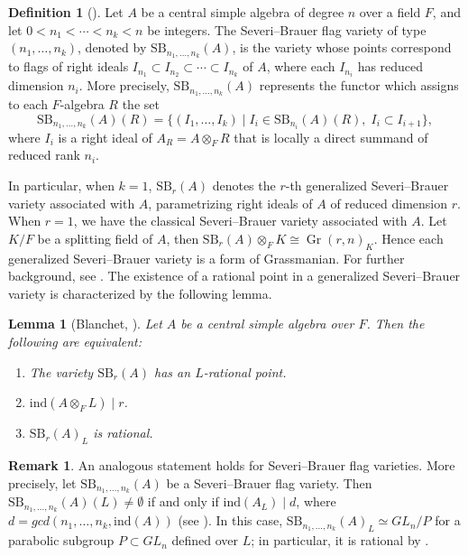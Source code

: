 \documentclass[10pt]{amsart}
\theoremstyle{plain}
\newtheorem{lemma}[thm]{Lemma}
\theoremstyle{definition}
\newtheorem{remark}[thm]{Remark}
\newtheorem{definition}[thm]{Definition}
\begin{document}
\begin{definition}[{\cite[Definition 4.1]{zerocycle}}]\label{flag}
Let \(A\) be a central simple algebra of degree \(n\) over a field \(F\), and let
\(0 < n_1 < \cdots < n_k < n\) be integers.
The Severi--Brauer flag variety of type \((n_1,\ldots,n_k)\), denoted by
\(\mathrm{SB}_{n_1,\ldots,n_k}(A)\), is the variety whose points correspond to flags of
right ideals \(I_{n_1} \subset I_{n_2} \subset \cdots \subset I_{n_k}\) of \(A\), where each \(I_{n_i}\) has reduced dimension \(n_i\).
More precisely, \(\mathrm{SB}_{n_1,\ldots,n_k}(A)\) represents the functor which assigns to
each \(F\)-algebra \(R\) the set
\[
\mathrm{SB}_{n_1,\ldots,n_k}(A)(R)
=
\bigl\{ (I_1,\ldots,I_k) \mid
I_i \in \mathrm{SB}_{n_i}(A)(R),\; I_i \subset I_{i+1} \bigr\},
\]
where \(I_i\) is a right ideal of \(A_R = A \otimes_F R\) that is locally a direct
summand of reduced rank \(n_i\).
\end{definition}
In particular, when \(k=1\), \(\mathrm{SB}_r(A)\) denotes the \(r\)-th generalized Severi--Brauer variety associated with \(A\), parametrizing right ideals of \(A\) of reduced dimension \(r\). When \(r=1\), we have the classical Severi--Brauer variety associated with \(A\). Let \(K/F\) be a splitting field of \(A\), then \(\mathrm{SB}_r(A) \otimes_F K \cong \operatorname{Gr}(r,n)_K\). Hence each generalized Severi--Brauer variety is a form of Grassmanian. For further background, see \cite{blanchet}. The existence of a rational point in a generalized Severi--Brauer variety is characterized by the following lemma.
\begin{lemma}[Blanchet, {\cite[Proposition 3]{blanchet}}]\label{point,index and rational}
Let \(A\) be a central simple algebra over \(F\). Then the following are equivalent:
\begin{enumerate}
    \item The variety \(\mathrm{SB}_r(A)\) has an \(L\)-rational point.
    \item \(\mathrm{ind}(A \otimes_F L) \mid r\).
    \item \(\mathrm{SB}_r(A)_L\) is rational.
\end{enumerate}
\end{lemma}
\begin{remark}\label{point on flag variety}
An analogous statement holds for Severi--Brauer flag varieties. More precisely, let \(\mathrm{SB}_{n_1,\ldots,n_k}(A)\) be a Severi--Brauer flag variety. Then \(\mathrm{SB}_{n_1,\ldots,n_k}(A)(L)\neq \emptyset\) if and only if \(\mathrm{ind}(A_L)\mid d\), where \(d=gcd(n_1,\ldots,n_k,\mathrm{ind}(A))\) (see \cite[Equation 5.3]{MPW}). In this case, \(\mathrm{SB}_{n_1,\ldots,n_k}(A)_L \simeq GL_n/P\) for a parabolic subgroup \(P \subset GL_n\) defined over \(L\); in particular, it is rational by \cite[Theorem~21.20]{borel1991linear}.
\end{remark}
\end{document}

